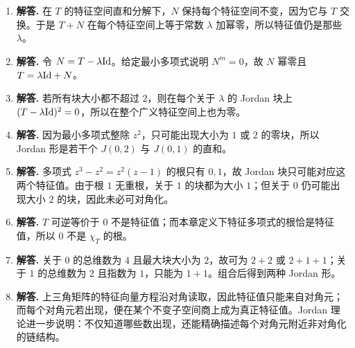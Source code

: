 \begin{enumerate}[label=\textbf{\arabic*.}, leftmargin=*, itemsep=1em]
\item \textbf{解答.} 在 $T$ 的特征空间直和分解下，$N$ 保持每个特征空间不变，因为它与 $T$ 交换。于是 $T+N$ 在每个特征空间上等于常数 $\lambda$ 加幂零，所以特征值仍是那些 $\lambda$。
\item \textbf{解答.} 令 $N=T-\lambda\mathrm{Id}$。给定最小多项式说明 $N^m=0$，故 $N$ 幂零且 $T=\lambda\mathrm{Id}+N$。
\item \textbf{解答.} 若所有块大小都不超过 $2$，则在每个关于 $\lambda$ 的 Jordan 块上 $(T-\lambda\mathrm{Id})^2=0$，所以在整个广义特征空间上也为零。
\item \textbf{解答.} 因为最小多项式整除 $z^2$，只可能出现大小为 $1$ 或 $2$ 的零块，所以 Jordan 形是若干个 $J(0,2)$ 与 $J(0,1)$ 的直和。
\item \textbf{解答.} 多项式 $z^3-z^2=z^2(z-1)$ 的根只有 $0,1$，故 Jordan 块只可能对应这两个特征值。由于根 $1$ 无重根，关于 $1$ 的块都为大小 $1$；但关于 $0$ 仍可能出现大小 $2$ 的块，因此未必可对角化。
\item \textbf{解答.} $T$ 可逆等价于 $0$ 不是特征值；而本章定义下特征多项式的根恰是特征值，所以 $0$ 不是 $\chi_T$ 的根。
\item \textbf{解答.} 关于 $0$ 的总维数为 $4$ 且最大块大小为 $2$，故可为 $2+2$ 或 $2+1+1$；关于 $1$ 的总维数为 $2$ 且指数为 $1$，只能为 $1+1$。组合后得到两种 Jordan 形。
\item \textbf{解答.} 上三角矩阵的特征向量方程沿对角读取，因此特征值只能来自对角元；而每个对角元若出现，便在某个不变子空间商上成为真正特征值。Jordan 理论进一步说明：不仅知道哪些数出现，还能精确描述每个对角元附近非对角化的链结构。
\end{enumerate}
